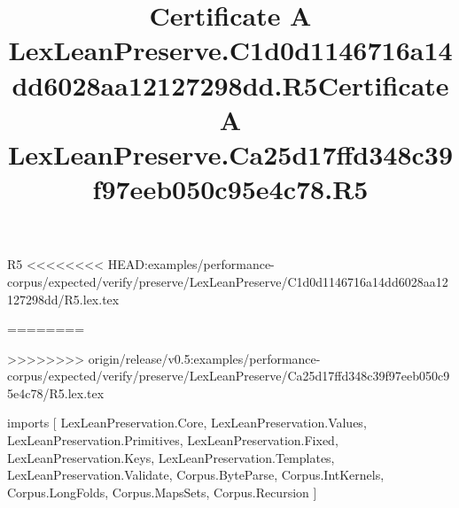 \begin{lexlean}{R5}
<<<<<<<< HEAD:examples/performance-corpus/expected/verify/preserve/LexLeanPreserve/C1d0d1146716a14dd6028aa12127298dd/R5.lex.tex
\title{Certificate A LexLeanPreserve.C1d0d1146716a14dd6028aa12127298dd.R5}
========
\title{Certificate A LexLeanPreserve.Ca25d17ffd348c39f97eeb050c95e4c78.R5}
>>>>>>>> origin/release/v0.5:examples/performance-corpus/expected/verify/preserve/LexLeanPreserve/Ca25d17ffd348c39f97eeb050c95e4c78/R5.lex.tex
\begin{coremodule}
imports [
  LexLeanPreservation.Core,
  LexLeanPreservation.Values,
  LexLeanPreservation.Primitives,
  LexLeanPreservation.Fixed,
  LexLeanPreservation.Keys,
  LexLeanPreservation.Templates,
  LexLeanPreservation.Validate,
  Corpus.ByteParse,
  Corpus.IntKernels,
  Corpus.LongFolds,
  Corpus.MapsSets,
  Corpus.Recursion
]


\end{coremodule}
\end{lexlean}
